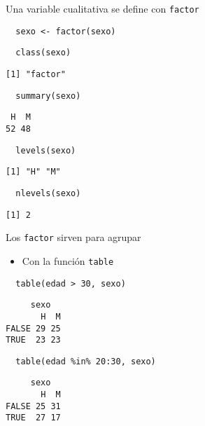 \documentclass[xcolor={usenames,svgnames,dvipsnames}]{beamer}
\begin{document}
\begin{frame}[fragile,label=sec-1-2]{Una variable cualitativa se define con \texttt{factor}}
 \lstset{language=R,label= ,caption= ,numbers=none}
\begin{lstlisting}
  sexo <- factor(sexo)
\end{lstlisting}

\lstset{language=R,label= ,caption= ,numbers=none}
\begin{lstlisting}
  class(sexo)
\end{lstlisting}

\begin{verbatim}
[1] "factor"
\end{verbatim}

\lstset{language=R,label= ,caption= ,numbers=none}
\begin{lstlisting}
  summary(sexo)
\end{lstlisting}

\begin{verbatim}
 H  M 
52 48
\end{verbatim}

\lstset{language=R,label= ,caption= ,numbers=none}
\begin{lstlisting}
  levels(sexo)
\end{lstlisting}

\begin{verbatim}
[1] "H" "M"
\end{verbatim}

\lstset{language=R,label= ,caption= ,numbers=none}
\begin{lstlisting}
  nlevels(sexo)
\end{lstlisting}

\begin{verbatim}
[1] 2
\end{verbatim}
\end{frame}

\begin{frame}[fragile,label=sec-1-3]{Los \texttt{factor} sirven para agrupar}
 \begin{itemize}
\item Con la función \texttt{table}
\end{itemize}
\lstset{language=R,label= ,caption= ,numbers=none}
\begin{lstlisting}
  table(edad > 30, sexo)
\end{lstlisting}

\begin{verbatim}
     sexo
       H  M
FALSE 29 25
TRUE  23 23
\end{verbatim}

\lstset{language=R,label= ,caption= ,numbers=none}
\begin{lstlisting}
  table(edad %in% 20:30, sexo)
\end{lstlisting}

\begin{verbatim}
     sexo
       H  M
FALSE 25 31
TRUE  27 17
\end{verbatim}
\end{frame}
\end{document}
